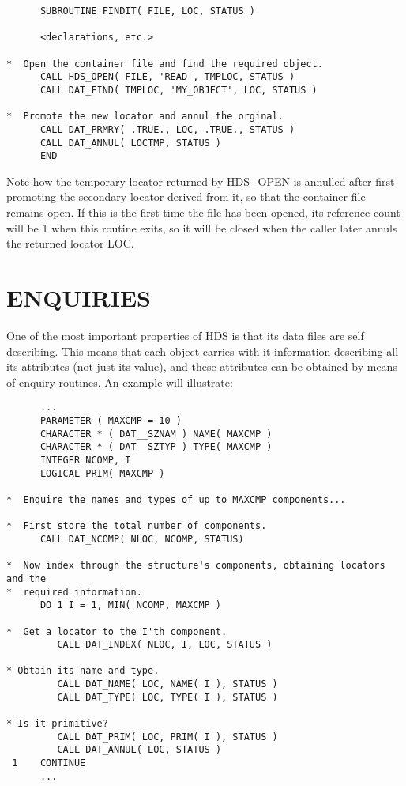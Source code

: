 \small
\begin{verbatim}
      SUBROUTINE FINDIT( FILE, LOC, STATUS )

      <declarations, etc.>

*  Open the container file and find the required object.
      CALL HDS_OPEN( FILE, 'READ', TMPLOC, STATUS )
      CALL DAT_FIND( TMPLOC, 'MY_OBJECT', LOC, STATUS )

*  Promote the new locator and annul the orginal.
      CALL DAT_PRMRY( .TRUE., LOC, .TRUE., STATUS )
      CALL DAT_ANNUL( LOCTMP, STATUS )
      END
\end{verbatim}
\normalsize

Note how the temporary locator returned by HDS\_OPEN is annulled after first
promoting the secondary locator derived from it, so that the container file
remains open. If this is the first time the file has been opened, its reference
count will be 1 when this routine exits, so it will be closed when the caller
later annuls the returned locator LOC.

\section{ENQUIRIES}
One of the most important properties of HDS is that its data files are self
describing. This means that each object carries with it information describing
all its attributes (not just its value), and these attributes can be obtained
by means of enquiry routines. An example will illustrate:

\small
\begin{verbatim}
      ...
      PARAMETER ( MAXCMP = 10 )
      CHARACTER * ( DAT__SZNAM ) NAME( MAXCMP )
      CHARACTER * ( DAT__SZTYP ) TYPE( MAXCMP )
      INTEGER NCOMP, I
      LOGICAL PRIM( MAXCMP )

*  Enquire the names and types of up to MAXCMP components...

*  First store the total number of components.
      CALL DAT_NCOMP( NLOC, NCOMP, STATUS)

*  Now index through the structure's components, obtaining locators and the
*  required information.
      DO 1 I = 1, MIN( NCOMP, MAXCMP )

*  Get a locator to the I'th component.
         CALL DAT_INDEX( NLOC, I, LOC, STATUS )

* Obtain its name and type.
         CALL DAT_NAME( LOC, NAME( I ), STATUS )
         CALL DAT_TYPE( LOC, TYPE( I ), STATUS )

* Is it primitive?
         CALL DAT_PRIM( LOC, PRIM( I ), STATUS )
         CALL DAT_ANNUL( LOC, STATUS )
 1    CONTINUE
      ...
\end{verbatim}
\normalsize

